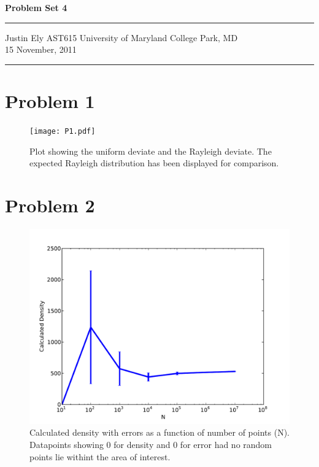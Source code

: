 \documentclass[a4paper,11pt]{article}
\begin{document}
\begin{flushright}

\vspace{1.1cm}

{\bf\Huge Problem Set 4}

\rule{0.25\linewidth}{0.5pt}

\vspace{0.5cm}
Justin Ely
\linebreak
\newline
\footnotesize{AST615 University of Maryland College Park, MD\\}
\vspace{0.5cm}
15 November, 2011
\end{flushright}

\noindent\rule{\linewidth}{1.0pt}
\section*{Problem 1}

\begin{figure}[h!]
\begin{center}
\texttt{[image: P1.pdf]}
\caption{Plot showing the uniform deviate and the Rayleigh deviate.  The expected Rayleigh distribution has been displayed for comparison.}
\end{center}
\end{figure}


\section*{Problem 2}

\begin{figure}[!h]
\begin{center}
\includegraphics[scale=.7]{P2.pdf}
\caption{Calculated density with errors as a function of number of points (N).  Datapoints showing 0 for density and 0 for error had no random points lie withint the area of interest.}
\end{center}
\end{figure}
\end{document}
